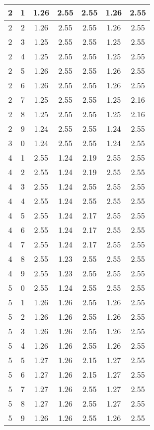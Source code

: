 \begin{longtable}{|c|c||c||c|c||c|c|}
	2 & 1 & 1.26 & 2.55 & 2.55 & 1.26 & 2.55 \\ \hline
	2 & 2 & 1.26 & 2.55 & 2.55 & 1.26 & 2.55 \\ \hline
	2 & 3 & 1.25 & 2.55 & 2.55 & 1.25 & 2.55 \\ \hline
	2 & 4 & 1.25 & 2.55 & 2.55 & 1.25 & 2.55 \\ \hline
	2 & 5 & 1.26 & 2.55 & 2.55 & 1.26 & 2.55 \\ \hline
	2 & 6 & 1.26 & 2.55 & 2.55 & 1.26 & 2.55 \\ \hline
	2 & 7 & 1.25 & 2.55 & 2.55 & 1.25 & 2.16 \\ \hline
	2 & 8 & 1.25 & 2.55 & 2.55 & 1.25 & 2.16 \\ \hline
	2 & 9 & 1.24 & 2.55 & 2.55 & 1.24 & 2.55 \\ \hline
	3 & 0 & 1.24 & 2.55 & 2.55 & 1.24 & 2.55 \\ \hline
	4 & 1 & 2.55 & 1.24 & 2.19 & 2.55 & 2.55 \\ \hline
	4 & 2 & 2.55 & 1.24 & 2.19 & 2.55 & 2.55 \\ \hline
	4 & 3 & 2.55 & 1.24 & 2.55 & 2.55 & 2.55 \\ \hline
	4 & 4 & 2.55 & 1.24 & 2.55 & 2.55 & 2.55 \\ \hline
	4 & 5 & 2.55 & 1.24 & 2.17 & 2.55 & 2.55 \\ \hline
	4 & 6 & 2.55 & 1.24 & 2.17 & 2.55 & 2.55 \\ \hline
	4 & 7 & 2.55 & 1.24 & 2.17 & 2.55 & 2.55 \\ \hline
	4 & 8 & 2.55 & 1.23 & 2.55 & 2.55 & 2.55 \\ \hline
	4 & 9 & 2.55 & 1.23 & 2.55 & 2.55 & 2.55 \\ \hline
	5 & 0 & 2.55 & 1.24 & 2.55 & 2.55 & 2.55 \\ \hline
	5 & 1 & 1.26 & 1.26 & 2.55 & 1.26 & 2.55 \\ \hline
	5 & 2 & 1.26 & 1.26 & 2.55 & 1.26 & 2.55 \\ \hline
	5 & 3 & 1.26 & 1.26 & 2.55 & 1.26 & 2.55 \\ \hline
	5 & 4 & 1.26 & 1.26 & 2.55 & 1.26 & 2.55 \\ \hline
	5 & 5 & 1.27 & 1.26 & 2.15 & 1.27 & 2.55 \\ \hline
	5 & 6 & 1.27 & 1.26 & 2.15 & 1.27 & 2.55 \\ \hline
	5 & 7 & 1.27 & 1.26 & 2.55 & 1.27 & 2.55 \\ \hline
	5 & 8 & 1.27 & 1.26 & 2.55 & 1.27 & 2.55 \\ \hline
	5 & 9 & 1.26 & 1.26 & 2.55 & 1.26 & 2.55 \\ \hline

\end{longtable}

